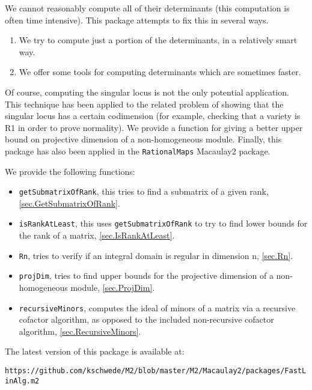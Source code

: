 \documentclass[11pt]{amsart}
\begin{document}
We cannot reasonably compute all of their determinants (this computation is often time intensive).  This package attempts to fix this in several ways.  
\begin{enumerate}
  \item We try to compute just a portion of the determinants, in a relatively smart way.
  \item We offer some tools for computing determinants which are sometimes faster.
\end{enumerate}
Of course, computing the singular locus is not the only potential application. This technique has been applied to the related problem of showing that the singular locus has a certain codimension (for example, checking that a variety is R1 in order to prove normality).  We provide a function for giving a better upper bound on projective dimension of a non-homogeneous module.  Finally, this package has also been applied in the {\tt RationalMaps} Macaulay2 package.  

We provide the following functions:

\begin{itemize}
  \item{} {\tt getSubmatrixOfRank}, this tries to find a submatrix of a given rank, \autoref{sec.GetSubmatrixOfRank}.
  \item{} {{\tt isRankAtLeast}}, this uses {\tt getSubmatrixOfRank} to try to find lower bounds for the rank of a matrix, \autoref{sec.IsRankAtLeast}.
  \item{}  {\tt Rn}, tries to verify if an integral domain is regular in dimension n, \autoref{sec.Rn}.
  \item{}  {\tt projDim}, tries to find upper bounds for the projective dimension of a non-homogeneous module, 
  \autoref{sec.ProjDim}.
  \item{}  {\tt recursiveMinors}, computes the ideal of minors of a matrix via a recursive cofactor algorithm, as opposed to the included non-recursive cofactor algorithm, \autoref{sec.RecursiveMinors}.
\end{itemize}

The latest version of this package is available at:
\begin{center}
  {\tt https://github.com/kschwede/M2/blob/master/M2/Macaulay2/packages/FastLinAlg.m2}
\end{center}

\end{document}
